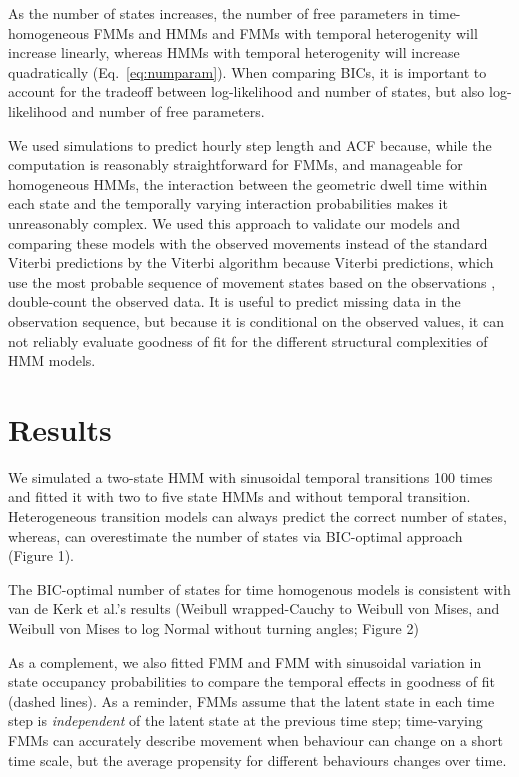 \documentclass{bmcart}
\begin{document}
As the number of states increases, the number of free parameters in time-homogeneous FMMs and HMMs and FMMs with temporal heterogenity will increase linearly, whereas HMMs with temporal heterogenity will increase quadratically (Eq.~\ref{eq:numparam}). When comparing BICs, it is important to account for the tradeoff between log-likelihood and number of states, but also log-likelihood and number of free parameters.

We used simulations to predict hourly step length and ACF 
because, while the computation is reasonably straightforward for FMMs, and manageable for homogeneous HMMs, the interaction between the geometric dwell time within each state and the temporally varying interaction probabilities makes it unreasonably complex. 
We used this approach to validate our models and comparing these models with the observed movements instead of the standard Viterbi predictions by the Viterbi algorithm because Viterbi predictions, which use the most probable sequence of movement states based on the observations \cite{zucchini_hidden_2009,langrock_flexible_2012}, double-count the observed data. It is useful to predict missing data in the observation sequence, but because it is conditional on the observed values, it can not reliably evaluate goodness of fit for the different structural complexities of HMM models.

\section*{Results}


We simulated a two-state HMM with sinusoidal temporal transitions 100 times and fitted it with two to five state HMMs and without temporal transition. Heterogeneous transition models can always predict the correct number of states, whereas, can overestimate the number of states via BIC-optimal approach (Figure 1). 


The BIC-optimal number of states for time homogenous models is consistent with van de Kerk et al.'s \cite{kerk2015hidden} results (Weibull wrapped-Cauchy to Weibull von Mises, and Weibull von Mises to log Normal without turning angles; Figure 2) 

As a complement, we also fitted FMM and FMM with sinusoidal variation in state occupancy probabilities to compare the temporal effects in goodness of fit (dashed lines).
As a reminder, FMMs assume that the latent state in each time step is 
\emph{independent} of the latent state at the previous time step; 
time-varying FMMs can accurately describe movement when behaviour can
change on a short time scale, but the average propensity for different
behaviours changes over time.
\end{document}
